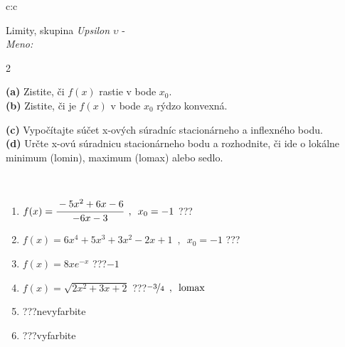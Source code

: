 \documentclass[10pt]{report}
\begin{document}
\begin{tabular}{c:c}
\begin{minipage}[c][104.5mm][t]{0.5\linewidth}
\begin{center}
\vspace{7mm}
{\huge Limity, skupina \textit{Upsilon $\upsilon$} -}\\[5mm]
\textit{Meno:}\phantom{xxxxxxxxxxxxxxxxxxxxxxxxxxxxxxxxxxxxxxxxxxxxxxxxxxxxxxxxxxxxxxxxx}\\[5mm]
\begin{minipage}{0.95\linewidth}
\begin{center}
{\small \begin{multicols}{2} \raggedright
\textbf{(a)} Zistite, či \(f(x)\) rastie v bode \(x_0\). \\[1mm]
\textbf{(b)} Zistite, či je \(f(x)\) v bode \(x_0\) rýdzo konvexná. \par \columnbreak
\textbf{(c)} Vypočítajte súčet x-ových súradníc stacionárneho a inflexného bodu. \\[1mm]
\textbf{(d)} Určte x-ovú súradnicu stacionárneho bodu a rozhodnite, či ide o lokálne minimum (lomin), maximum (lomax) alebo sedlo. \\[1mm]
\end{multicols}
}
\end{center}
\end{minipage}
\\[4mm]
\begin{minipage}{0.79\linewidth}
\begin{center}
\begin{varwidth}{\linewidth}
\begin{enumerate}
\normalsize
\item $f(x)=\cfrac{-5x^2+6x-6}{-6x-3}\enspace , \enspace x_0=-1$\quad \dotfill\; ???\;\dotfill \quad {}
\item $f(x)=6x^4+5x^3+3x^2-2x+1\enspace , \enspace x_0=-1$\quad \dotfill\; ???\;\dotfill \quad {}
\item $f(x)=8xe^{-x}$\quad \dotfill\; ???\;\dotfill \quad $-1$
\item $f(x)=\sqrt{2x^2+3x+2}$\quad \dotfill\; ???\;\dotfill \quad $\nicefrac{-3}{4}\enspace , \enspace\text{lomax}$
\item \quad \dotfill\; ???\;\dotfill \quad nevyfarbite
\item \quad \dotfill\; ???\;\dotfill \quad vyfarbite
\end{enumerate}
\end{varwidth}
\end{center}

\end{minipage}
\end{center}
\end{minipage}
\end{tabular}
\end{document}
